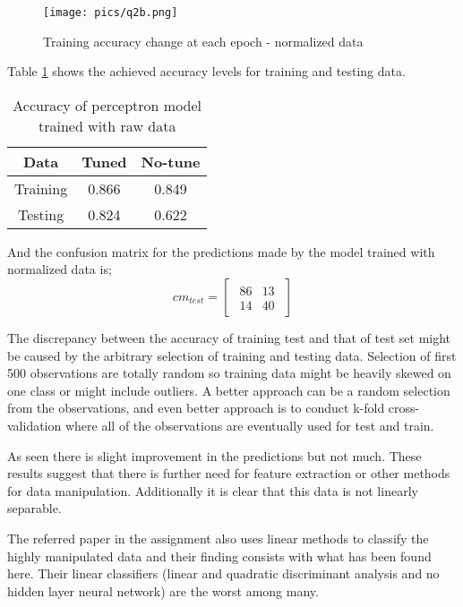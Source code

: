 \documentclass[11pt]{article}
\begin{document}
\begin{figure}[H]
\centering
\texttt{[image: pics/q2b.png]}
\captionsetup{justification=centering}
\caption{Training accuracy change at each epoch - normalized data}
\label{fig:q2_b_acc}
\end{figure}

Table \ref{table:q2b} shows the achieved accuracy levels for training and testing data.

\bgroup
\def\arraystretch{1.5}%
\begin{table}[H]
\centering
\caption{Accuracy of perceptron model trained with raw data}
\begin{tabular}{|c|c|c|}
\hline
Data   &  Tuned & No-tune \\ \hline
Training & 0.866 & 0.849  \\ \hline
Testing  & 0.824 & 0.622  \\ \hline
\end{tabular}
\label{table:q2b}
\end{table}
\egroup

And the confusion matrix for the predictions made by the model trained with normalized data is;
$$
cm_{test}=
 \begin{bmatrix}
 \begin{array}{rr}
86 &  13  \\
14 &  40 
\end{array}   
\end{bmatrix}
$$

The discrepancy between the accuracy of training test and that of test set might be caused by the arbitrary selection of training and testing data. Selection of first 500 observations are totally random so training data might be heavily skewed on one class or might include outliers. A better approach can be a random selection from the observations, and even better approach is to conduct k-fold cross-validation where all of the observations are eventually used for test and train. \medskip

As seen there is slight improvement in the predictions but not much. These results suggest that there is further need for feature extraction or other methods for data manipulation. Additionally it is clear that this data is not linearly separable. \medskip

The referred paper in the assignment also uses linear methods to classify the highly manipulated data and their finding consists with what has been found here. Their linear classifiers (linear and quadratic discriminant analysis and no hidden layer neural network) are the worst among many. \medskip
\end{document}

